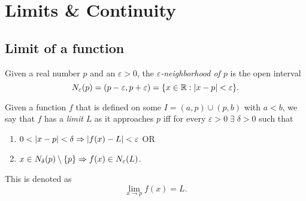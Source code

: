 
\section{Limits \& Continuity}
\subsection{Limit of a function}
\vskip 5pt
\begin{defn}[Neighborhood] \label{defn:limit:neighborhood}
    Given a real number $p$ and an $\varepsilon > 0$, the \emph{$\varepsilon$-neighborhood of $p$} is the open interval \[
        N_{\varepsilon}(p) = \paren{p - \varepsilon, p + \varepsilon} = \set{x \in \R : \abs{ x - p} < \varepsilon}.
    \] 
\end{defn}

\begin{defn} \label{defn:limit:function}
    Given a function $f$ that is defined on some $I = (a, p) \cup (p, b)$ with $a < b$, we say that $f$ has a \emph{limit} $L$ as it approaches $p$ iff for every $\varepsilon > 0 \;\exists\; \delta > 0$ such that
    \begin{enumerate}[label=(\alph*)]
        \item $0 < \abs{ x - p } < \delta \implies \abs{ f(x) - L } < \varepsilon$ OR
        \item $x \in N_{\delta}(p) \setminus \set{p} \implies f(x) \in N_{\varepsilon}(L)$.
    \end{enumerate}
    This is denoted as \[
        \lim_{x \to p} f(x) = L.
    \]
\end{defn}

